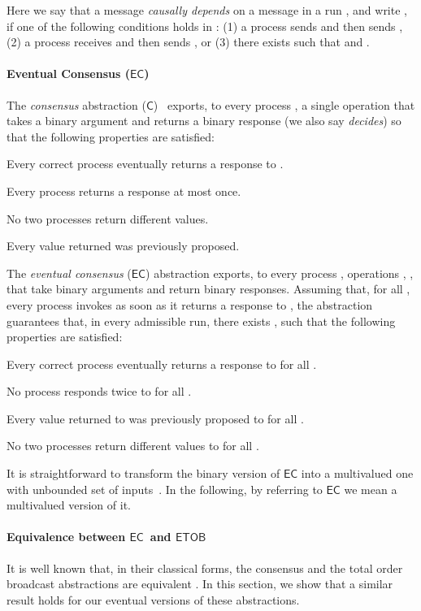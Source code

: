 \documentclass[11pt]{article}
\newcommand{\C}{\ensuremath{\mathsf{C}}}
\newcommand{\EC}{\ensuremath{\mathsf{EC}}}
\newcommand{\ETOB}{\ensuremath{\mathsf{ETOB}}}
\begin{document}
Here we say that a message  \emph{causally depends} on a message  in a run ,
and write , if one of the following conditions
holds in : (1) a process  sends  and
then sends , (2) a process  receives  and then sends
, or (3) there exists  such that  and
.       


\paragraph{Eventual Consensus (\EC)}
The \emph{consensus} abstraction (\C)~\cite{FLP85} exports, to every process , a
single operation  that takes a
binary argument and
returns a binary response (we also say \emph{decides})  so that the following properties are
satisfied:

\begin{description}\itemsep0pt
\item[\C-Termination] Every correct process eventually returns a response to .
\item[\C-Integrity] Every process returns a response at most once.
\item[\C-Agreement] No two processes return different values.
\item[\C-Validity] Every value returned was previously proposed.
\end{description}
The \emph{eventual  consensus} (\EC) abstraction exports, to
every process , operations ,
,  that take binary arguments and return
binary responses. Assuming that, for all
,  every process invokes
 as soon as
it returns a response to , the abstraction guarantees that,
in every admissible run, there exists , such that the following properties are satisfied:
\begin{description}\itemsep0pt
\item[\EC-Termination] Every correct process eventually returns a response to  for all .
\item[\EC-Integrity] No process responds twice to
   for all .
\item[\EC-Validity] Every value returned to  was previously proposed to  for all .
\item[\EC-Agreement] No two processes return different values to  for all .
\end{description}
It is straightforward to transform the binary version of {\EC} into a
multivalued one with unbounded set of inputs~\cite{MRT00-mv}. In the following, by referring to
{\EC} we mean a multivalued version of it.

\paragraph{Equivalence between \EC~and \ETOB}
It is well known that, in their classical forms, the consensus and the total order broadcast abstractions are equivalent \cite{CT96}. In this section, we show that a similar result holds for our eventual versions of these abstractions.
\end{document}
